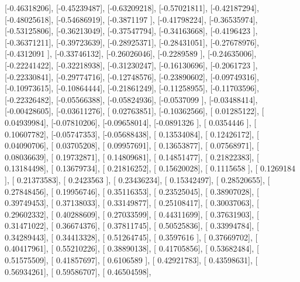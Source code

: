 \documentclass{article}
\begin{document}
       [-0.46318206],
       [-0.45239487],
       [-0.63209218],
       [-0.57021811],
       [-0.42187294],
       [-0.48025618],
       [-0.54686919],
       [-0.3871197 ],
       [-0.41798224],
       [-0.36535974],
       [-0.53125806],
       [-0.36213049],
       [-0.37547794],
       [-0.34163668],
       [-0.4196423 ],
       [-0.36371211],
       [-0.39723639],
       [-0.28925371],
       [-0.28431051],
       [-0.27678976],
       [-0.4312091 ],
       [-0.33746132],
       [-0.26026046],
       [-0.2289589 ],
       [-0.24635006],
       [-0.22241422],
       [-0.32218938],
       [-0.31230247],
       [-0.16130696],
       [-0.2061723 ],
       [-0.22330841],
       [-0.29774716],
       [-0.12748576],
       [-0.23890602],
       [-0.09749316],
       [-0.10973615],
       [-0.10864444],
       [-0.21861249],
       [-0.11258955],
       [-0.11703596],
       [-0.22326482],
       [-0.05566388],
       [-0.05824936],
       [-0.0537099 ],
       [-0.03488414],
       [-0.00428605],
       [-0.03611276],
       [ 0.02763851],
       [-0.10362566],
       [ 0.01285122],
       [ 0.04939984],
       [-0.07810206],
       [-0.09658014],
       [-0.0891326 ],
       [ 0.0354446 ],
       [ 0.10607782],
       [-0.05747353],
       [-0.05688438],
       [ 0.13534084],
       [ 0.12426172],
       [ 0.04090706],
       [ 0.03705208],
       [ 0.09957691],
       [ 0.13653877],
       [ 0.07568971],
       [ 0.08036639],
       [ 0.19732871],
       [ 0.14809681],
       [ 0.14851477],
       [ 0.21822383],
       [ 0.13184498],
       [ 0.13679734],
       [ 0.21816252],
       [ 0.15620028],
       [ 0.1115658 ],
       [ 0.1269184 ],
       [ 0.21373583],
       [ 0.2423563 ],
       [ 0.23436234],
       [ 0.15342497],
       [ 0.28520655],
       [ 0.27848456],
       [ 0.19956746],
       [ 0.35116353],
       [ 0.23525045],
       [ 0.38907028],
       [ 0.39749453],
       [ 0.37138033],
       [ 0.33149877],
       [ 0.25108417],
       [ 0.30037063],
       [ 0.29602332],
       [ 0.40288609],
       [ 0.27033599],
       [ 0.44311699],
       [ 0.37631903],
       [ 0.31471022],
       [ 0.36674376],
       [ 0.37811745],
       [ 0.50525836],
       [ 0.33994784],
       [ 0.34289443],
       [ 0.34413328],
       [ 0.51264745],
       [ 0.3597616 ],
       [ 0.37669702],
       [ 0.40417961],
       [ 0.55210226],
       [ 0.38890138],
       [ 0.41705856],
       [ 0.53682484],
       [ 0.51575509],
       [ 0.41857697],
       [ 0.6106589 ],
       [ 0.42921783],
       [ 0.43598631],
       [ 0.56934261],
       [ 0.59586707],
       [ 0.46504598],
\end{document}
